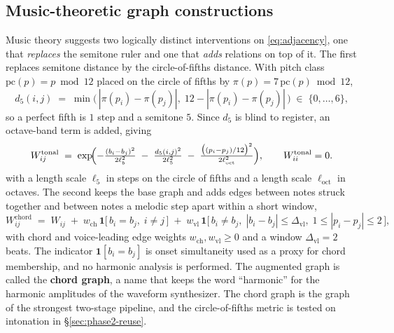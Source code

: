 \documentclass[11pt,a4paper]{report}
\begin{document}
\subsection{Music-theoretic graph constructions}\label{sec:graphvariants}
Music theory suggests two logically distinct interventions on
\eqref{eq:adjacency}, one that \emph{replaces} the semitone ruler and one
that \emph{adds} relations on top of it. The first replaces semitone
distance by the circle-of-fifths distance. With pitch class
$\mathrm{pc}(p) = p \bmod 12$ placed on the circle of fifths by
$\pi(p) = 7\,\mathrm{pc}(p) \bmod 12$,
\begin{equation}
  d_5(i,j) \;=\; \min\bigl(\,|\pi(p_i) - \pi(p_j)|,\; 12 - |\pi(p_i) - \pi(p_j)|\,\bigr)
  \;\in\; \{0,\dots,6\},
  \label{eq:fifths}
\end{equation}
so a perfect fifth is $1$ step and a semitone $5$. Since $d_5$ is blind to
register, an octave-band term is added, giving
\begin{equation}
  W^{\mathrm{tonal}}_{ij} \;=\; \exp\!\Bigl( -\tfrac{(b_i - b_j)^2}{2\ell_b^2}
    \;-\; \tfrac{d_5(i,j)^2}{2\ell_5^2}
    \;-\; \tfrac{\bigl((p_i - p_j)/12\bigr)^2}{2\ell_{\mathrm{oct}}^2} \Bigr),
  \qquad W^{\mathrm{tonal}}_{ii} = 0 .
  \label{eq:tonaladj}
\end{equation}
with a length scale $\ell_5$ in steps on the circle of fifths and a length
scale $\ell_{\mathrm{oct}}$ in octaves. The second keeps the base graph and adds edges between notes struck together
and between notes a melodic step apart within a short window,
\begin{equation}
  W^{\mathrm{chord}}_{ij} \;=\; W_{ij}
    \;+\; w_{\mathrm{ch}}\, \mathbf{1}\bigl[\, b_i = b_j,\; i \neq j \,\bigr]
    \;+\; w_{\mathrm{vl}}\, \mathbf{1}\bigl[\, b_i \neq b_j,\;
        |b_i - b_j| \le \Delta_{\mathrm{vl}},\;
        1 \le |p_i - p_j| \le 2 \,\bigr],
  \label{eq:harmadj}
\end{equation}
with chord and voice-leading edge weights $w_{\mathrm{ch}}, w_{\mathrm{vl}} \ge 0$
and a window $\Delta_{\mathrm{vl}} = 2$ beats. The indicator $\mathbf 1[b_i = b_j]$
is onset simultaneity used as a proxy for chord membership, and no harmonic
analysis is performed. The augmented graph is called the \textbf{chord
graph}, a name that keeps the word ``harmonic'' for the harmonic amplitudes
of the waveform synthesizer. The chord graph is the graph of the strongest
two-stage pipeline, and the circle-of-fifths metric is tested on
intonation in \S\ref{sec:phase2-reuse}.
\end{document}
